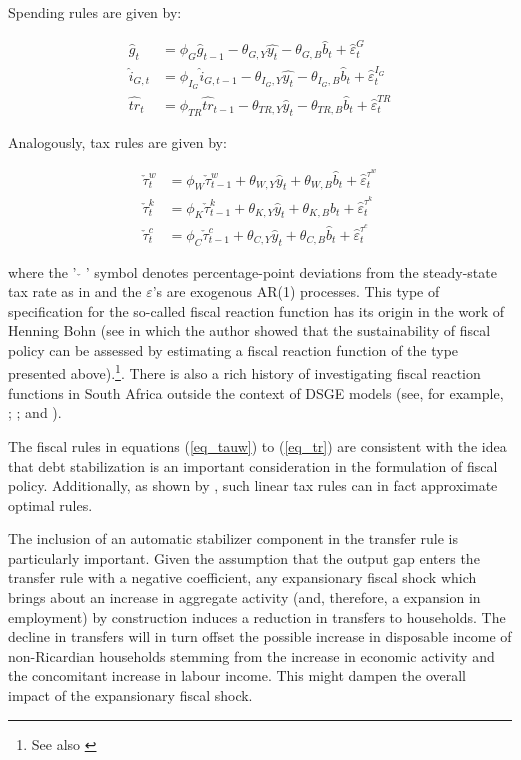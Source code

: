 \documentclass[a4paper,11pt]{article}
\numberwithin{equation}{section}
\begin{document}
	Spending rules are given by:	
	
	\begin{align}
	\hat{g}_t&=\phi_G\hat{g}_{t-1}-\theta_{G,Y}\hat{y_t} -\theta_{G,B}\hat{b}_t+\hat{\varepsilon}_t^G\\\label{g_rule}
	\hat{i}_{G,t}&=\phi_{I_G}\hat{i}_{G,t-1}-\theta_{I_G,Y}\hat{y_t}-\theta_{I_G,B}\hat{b}_t+\hat{\varepsilon}_t^{I_G}\\
	\hat{tr}_t&=\phi_{TR}\hat{tr}_{t-1}-\theta_{TR,Y}\hat{y}_t-\theta_{TR,B}\hat{b}_t+\hat{\varepsilon}_t^{TR} \label{eq_tr}
	\end{align} 
	
	Analogously, tax rules are given by:
	
	\begin{align}
	\check{\tau}_t^w&=\phi_W\check{\tau}_{t-1}^w+\theta_{W,Y}\hat{y}_t+\theta_{W,B}\hat{b}_t+\hat{\varepsilon}_t^{\tau^w}\\\label{eq_tauw}
	\check{\tau}_t^k&=\phi_K\check{\tau}_{t-1}^k+\theta_{K,Y}\hat{y}_t+\theta_{K,B}\hat{b}_t+\hat{\varepsilon}_t^{\tau^k}\\
	\check{\tau}_t^c&=\phi_C\check{\tau}_{t-1}^c+\theta_{C,Y}\hat{y}_t+\theta_{C,B}\hat{b}_t+\hat{\varepsilon}_t^{\tau^c} \label{tc_rule}
	\end{align}
	
	where the ' $\check{}$ ' symbol denotes percentage-point deviations from the steady-state tax rate as in \cite{coenen2013} and the $\varepsilon$'s are exogenous AR(1) processes. This type of specification for the so-called fiscal reaction function has its origin in the work of Henning Bohn (see \citealp{bohn1998} in which the author showed that the sustainability of fiscal policy can be assessed by estimating a fiscal reaction function of the type presented above).\footnote{See also \cite{bohn1995,bohn2007,bohn2011}}. There is also a rich history of investigating fiscal reaction functions in South Africa outside the context of DSGE models (see, for example, \citealp{burger2012a}; \citealp{burger2012b}; and \citealp{burger2015}).  
	
	The fiscal rules in equations (\ref{eq_tauw}) to (\ref{eq_tr}) are consistent with the idea that debt stabilization is an important consideration in the formulation of fiscal policy. Additionally, as shown by \cite{ravn2007}, such linear tax rules can in fact approximate optimal rules.
	
	The inclusion of an automatic stabilizer component in the transfer rule is particularly important. Given the assumption that the output gap enters the transfer rule with a negative coefficient, any expansionary fiscal shock which brings about an increase in aggregate activity (and, therefore, a expansion in employment) by construction induces a reduction in transfers to households. The decline in transfers will in turn offset the possible increase in disposable income of non-Ricardian households stemming from the increase in economic activity and the concomitant increase in labour income. This might dampen the overall impact of the expansionary fiscal shock.
	
\end{document}
